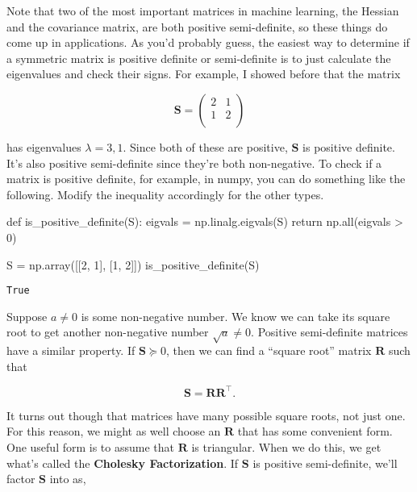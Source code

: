 \documentclass[
  letterpaper,
  DIV=11,
  numbers=noendperiod]{scrreprt}
\newenvironment{Shaded}{\begin{snugshade}}{\end{snugshade}}
\newcommand{\BuiltInTok}[1]{\textcolor[rgb]{0.00,0.23,0.31}{#1}}
\newcommand{\ControlFlowTok}[1]{\textcolor[rgb]{0.00,0.23,0.31}{#1}}
\newcommand{\DecValTok}[1]{\textcolor[rgb]{0.68,0.00,0.00}{#1}}
\newcommand{\KeywordTok}[1]{\textcolor[rgb]{0.00,0.23,0.31}{#1}}
\newcommand{\NormalTok}[1]{\textcolor[rgb]{0.00,0.23,0.31}{#1}}
\newcommand{\OperatorTok}[1]{\textcolor[rgb]{0.37,0.37,0.37}{#1}}
\begin{document}
Note that two of the most important matrices in machine learning, the
Hessian and the covariance matrix, are both positive semi-definite, so
these things do come up in applications. As you'd probably guess, the
easiest way to determine if a symmetric matrix is positive definite or
semi-definite is to just calculate the eigenvalues and check their
signs. For example, I showed before that the matrix

\[
\mathbf{S} = 
\begin{pmatrix}
2 & 1 \\
1 & 2 \\
\end{pmatrix}
\]

has eigenvalues \(\lambda = 3, 1\). Since both of these are positive,
\(\mathbf{S}\) is positive definite. It's also positive semi-definite
since they're both non-negative. To check if a matrix is positive
definite, for example, in numpy, you can do something like the
following. Modify the inequality accordingly for the other types.

\begin{Shaded}
\begin{Highlighting}[]
\KeywordTok{def}\NormalTok{ is\_positive\_definite(S):}
\NormalTok{    eigvals }\OperatorTok{=}\NormalTok{ np.linalg.eigvals(S)}
    \ControlFlowTok{return}\NormalTok{ np.}\BuiltInTok{all}\NormalTok{(eigvals }\OperatorTok{\textgreater{}} \DecValTok{0}\NormalTok{)}

\NormalTok{S }\OperatorTok{=}\NormalTok{ np.array([[}\DecValTok{2}\NormalTok{, }\DecValTok{1}\NormalTok{], }
\NormalTok{              [}\DecValTok{1}\NormalTok{, }\DecValTok{2}\NormalTok{]])}
\NormalTok{is\_positive\_definite(S)}
\end{Highlighting}
\end{Shaded}

\begin{verbatim}
True
\end{verbatim}

Suppose \(a \neq 0\) is some non-negative number. We know we can take
its square root to get another non-negative number \(\sqrt{a} \neq 0\).
Positive semi-definite matrices have a similar property. If
\(\mathbf{S} \succcurlyeq 0\), then we can find a ``square root'' matrix
\(\mathbf{R}\) such that

\[\mathbf{S} = \mathbf{R} \mathbf{R}^\top.\]

It turns out though that matrices have many possible square roots, not
just one. For this reason, we might as well choose an \(\mathbf{R}\)
that has some convenient form. One useful form is to assume that
\(\mathbf{R}\) is triangular. When we do this, we get what's called the
\textbf{Cholesky Factorization}. If \(\mathbf{S}\) is positive
semi-definite, we'll factor \(\mathbf{S}\) into as,
\end{document}
